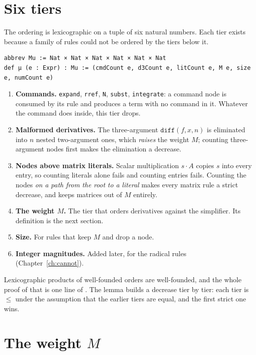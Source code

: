 \section{Six tiers}

The ordering is lexicographic on a tuple of six natural numbers. Each tier exists because a
family of rules could not be ordered by the tiers below it.

\begin{verbatim}
abbrev Mu := Nat × Nat × Nat × Nat × Nat × Nat
def μ (e : Expr) : Mu := (cmdCount e, d3Count e, litCount e, M e, size e, numCount e)
\end{verbatim}

\begin{enumerate}[nosep]
  \item \textbf{Commands.} \texttt{expand}, \texttt{rref}, \texttt{N}, \texttt{subst},
    \texttt{integrate}: a command node is consumed by its rule and produces a term with no command
    in it. Whatever the command does inside, this tier drops.
  \item \textbf{Malformed derivatives.} The three-argument $\texttt{diff}(f, x, n)$ is eliminated
    into $n$ nested two-argument ones, which \emph{raises} the weight $M$; counting three-argument
    nodes first makes the elimination a decrease.
  \item \textbf{Nodes above matrix literals.} Scalar multiplication $s \cdot A$ copies $s$ into
    every entry, so counting literals alone fails and counting entries fails. Counting the nodes
    \emph{on a path from the root to a literal} makes every matrix rule a strict decrease, and
    keeps matrices out of $M$ entirely.
  \item \textbf{The weight $M$.} The tier that orders derivatives against the simplifier. Its
    definition is the next section.
  \item \textbf{Size.} For rules that keep $M$ and drop a node.
  \item \textbf{Integer magnitudes.} Added later, for the radical rules (Chapter~\ref{ch:cannot}).
\end{enumerate}

Lexicographic products of well-founded orders are well-founded, and the whole proof of that is one
line of . The lemma  builds a decrease tier by tier: each tier is
$\le$ under the assumption that the earlier tiers are equal, and the first strict one wins.

\section{The weight $M$}

